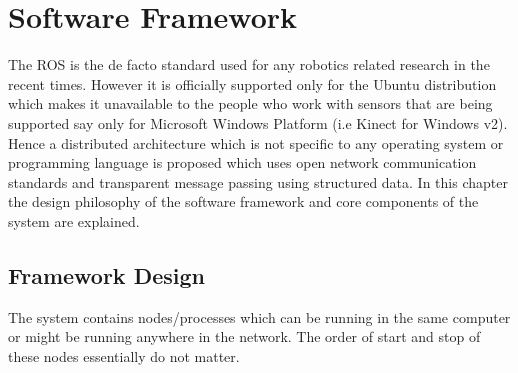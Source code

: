 
\chapter{Software Framework} %

\label{Chapter4} %

		The ROS\cite{quigley2009ros} is the de facto standard used for any robotics related research in the recent times. However it is officially supported only for the Ubuntu distribution which makes it unavailable to the people who work with sensors that are being supported say only for Microsoft Windows Platform (i.e Kinect for Windows v2). Hence a distributed architecture which is not specific to any operating system or programming language is proposed which uses open network communication standards and transparent message passing using structured data. In this chapter the design philosophy of the software framework and core components of the system are explained.
		
\section{Framework Design}		
	The system contains nodes/processes which can be running in the same computer or might be running anywhere in the network. The order of start and stop of these nodes essentially do not matter.
